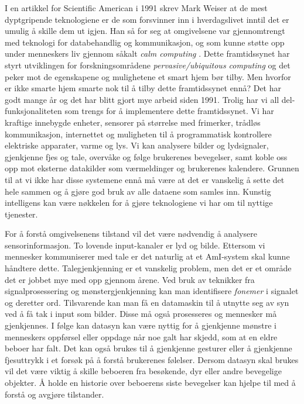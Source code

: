 I en artikkel for Scientific American i 1991 skrev Mark Weiser at de mest dyptgripende teknologiene er de som forsvinner inn i hverdagslivet inntil det er umulig å skille dem ut igjen. Han så for seg at omgivelsene var gjennomtrengt med teknologi for databehandlig og kommunikasjon, og som kunne støtte opp under menneskers liv gjennom såkalt \emph{calm computing} \citet{weiser91}. Dette framtidssynet har styrt utviklingen for forskningsområdene \emph{pervasive/ubiquitous computing} og det peker mot de egenskapene og mulighetene et smart hjem bør tilby. Men hvorfor er ikke smarte hjem smarte nok til å tilby dette framtidssynet ennå? Det har godt mange år og det har blitt gjort mye arbeid siden 1991. Trolig har vi all del-funksjonaliteten som trengs for å implementere dette framtidssynet. Vi har kraftige innebygde enheter, sensorer på størrelse med frimerker, trådløs kommunikasjon, internettet og muligheten til å programmatisk kontrollere elektriske apparater, varme og lys. Vi kan analysere bilder og lydsignaler, gjenkjenne fjes og tale, overvåke og følge brukerenes bevegelser, samt koble oss opp mot eksterne datakilder som værmeldinger og brukerenes kalendere. Grunnen til at vi ikke har disse systemene ennå må være at det er vanskelig å sette det hele sammen og å gjøre god bruk av alle dataene som samles inn. Kunstig intelligens kan være nøkkelen for å gjøre teknologiene vi har om til nyttige tjenester.

For å forstå omgivelsenens tilstand vil det være nødvendig å analysere sensorinformasjon. To lovende input-kanaler er lyd og bilde. Ettersom vi mennesker kommuniserer med tale er det naturlig at et AmI-system skal kunne håndtere dette. Talegjenkjenning er et vanskelig problem, men det er et område det er jobbet mye med opp gjennom årene. Ved bruk av teknikker fra signalprosessering og mønstergjenkjenning kan man identifisere \emph{fonemer} i signalet og deretter ord. Tilsvarende kan man få en datamaskin til å utnytte seg av syn ved å få tak i input som bilder. Disse må også prosesseres og mennesker må gjenkjennes. I følge \citet{augustonugent06} kan datasyn kan være nyttig for å gjenkjenne mønstre i menneskers oppførsel eller oppdage når noe galt har skjedd, som at en eldre beboer har falt. Det kan også brukes til å gjenkjenne gesturer eller å gjenkjenne fjesuttrykk i et forsøk på å forstå brukerenes følelser. Dersom datasyn skal brukes vil det være viktig å skille beboeren fra besøkende, dyr eller andre bevegelige objekter. Å holde en historie over beboerens siste bevegelser kan hjelpe til med å forstå og avgjøre tilstander.

